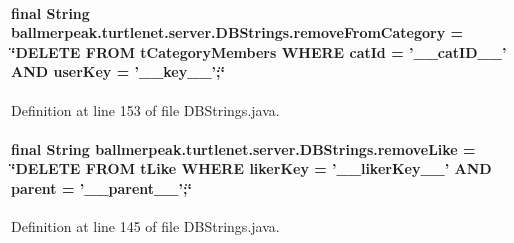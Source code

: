 \hypertarget{classballmerpeak_1_1turtlenet_1_1server_1_1DBStrings_a46667f523f0f1dad5378e5b23b49a18e}{
\paragraph[{remove\-From\-Category}]{\setlength{\rightskip}{0pt plus 5cm}final String ballmerpeak.\-turtlenet.\-server.\-D\-B\-Strings.\-remove\-From\-Category = \char`\"{}D\-E\-L\-E\-T\-E F\-R\-O\-M t\-Category\-Members W\-H\-E\-R\-E cat\-Id = '\-\_\-\-\_\-cat\-I\-D\-\_\-\-\_\-' A\-N\-D user\-Key = '\-\_\-\-\_\-key\-\_\-\-\_\-';\char`\"{}\hspace{0.3cm}{\ttfamily [static]}}}\label{classballmerpeak_1_1turtlenet_1_1server_1_1DBStrings_a46667f523f0f1dad5378e5b23b49a18e}


Definition at line 153 of file D\-B\-Strings.\-java.

\hypertarget{classballmerpeak_1_1turtlenet_1_1server_1_1DBStrings_a17b087b58c02d5e260242f71add2c9ca}{
\paragraph[{remove\-Like}]{\setlength{\rightskip}{0pt plus 5cm}final String ballmerpeak.\-turtlenet.\-server.\-D\-B\-Strings.\-remove\-Like = \char`\"{}D\-E\-L\-E\-T\-E F\-R\-O\-M t\-Like W\-H\-E\-R\-E liker\-Key = '\-\_\-\-\_\-liker\-Key\-\_\-\-\_\-' A\-N\-D parent = '\-\_\-\-\_\-parent\-\_\-\-\_\-';\char`\"{}\hspace{0.3cm}{\ttfamily [static]}}}\label{classballmerpeak_1_1turtlenet_1_1server_1_1DBStrings_a17b087b58c02d5e260242f71add2c9ca}


Definition at line 145 of file D\-B\-Strings.\-java.


